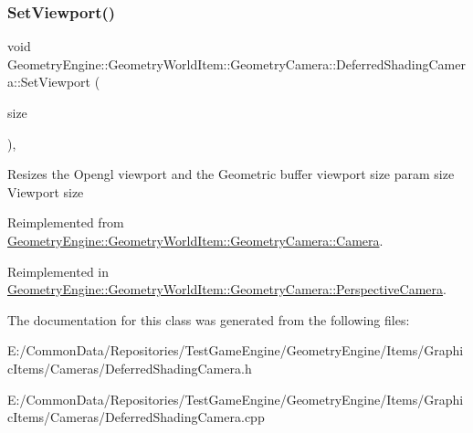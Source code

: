 \subsubsection{\texorpdfstring{SetViewport()}{SetViewport()}}
{\footnotesize\ttfamily void Geometry\+Engine\+::\+Geometry\+World\+Item\+::\+Geometry\+Camera\+::\+Deferred\+Shading\+Camera\+::\+Set\+Viewport (\begin{DoxyParamCaption}\item[{const Q\+Vector4D \&}]{size }\end{DoxyParamCaption})\hspace{0.3cm}{\ttfamily [override]}, {\ttfamily [virtual]}}

Resizes the Opengl viewport and the Geometric buffer viewport size param size Viewport size 

Reimplemented from \mbox{\hyperlink{class_geometry_engine_1_1_geometry_world_item_1_1_geometry_camera_1_1_camera_ad2a1aa18da04337fe34de5e9420c9703}{Geometry\+Engine\+::\+Geometry\+World\+Item\+::\+Geometry\+Camera\+::\+Camera}}.



Reimplemented in \mbox{\hyperlink{class_geometry_engine_1_1_geometry_world_item_1_1_geometry_camera_1_1_perspective_camera_a6b405005376c1396b311ebd16dcc4e98}{Geometry\+Engine\+::\+Geometry\+World\+Item\+::\+Geometry\+Camera\+::\+Perspective\+Camera}}.



The documentation for this class was generated from the following files\+:\begin{DoxyCompactItemize}
\item 
E\+:/\+Common\+Data/\+Repositories/\+Test\+Game\+Engine/\+Geometry\+Engine/\+Items/\+Graphic\+Items/\+Cameras/Deferred\+Shading\+Camera.\+h\item 
E\+:/\+Common\+Data/\+Repositories/\+Test\+Game\+Engine/\+Geometry\+Engine/\+Items/\+Graphic\+Items/\+Cameras/Deferred\+Shading\+Camera.\+cpp\end{DoxyCompactItemize}
